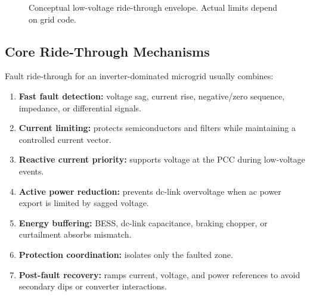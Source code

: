 \documentclass[11pt]{article}
\begin{document}
\begin{figure}[h]
\centering
{}
\caption{Conceptual low-voltage ride-through envelope. Actual limits depend on grid code.}
\end{figure}

\subsection{Core Ride-Through Mechanisms}
Fault ride-through for an inverter-dominated microgrid usually combines:
\begin{enumerate}
  \item \textbf{Fast fault detection:} voltage sag, current rise, negative/zero
  sequence, impedance, or differential signals.
  \item \textbf{Current limiting:} protects semiconductors and filters while
  maintaining a controlled current vector.
  \item \textbf{Reactive current priority:} supports voltage at the PCC during
  low-voltage events.
  \item \textbf{Active power reduction:} prevents dc-link overvoltage when ac
  power export is limited by sagged voltage.
  \item \textbf{Energy buffering:} BESS, dc-link capacitance, braking chopper, or
  curtailment absorbs mismatch.
  \item \textbf{Protection coordination:} isolates only the faulted zone.
  \item \textbf{Post-fault recovery:} ramps current, voltage, and power references
  to avoid secondary dips or converter interactions.
\end{enumerate}
\end{document}
